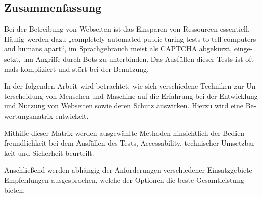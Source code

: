 \begin{otherlanguage}{ngerman}
	\chapter*{Zusammenfassung}
	Bei der Betreibung von Webseiten ist das Einsparen von Ressourcen essentiell. 
	Häufig werden dazu „completely automated public turing tests to tell computers and humans apart“, im Sprachgebrauch meist als CAPTCHA abgekürzt, eingesetzt, um Angriffe durch Bots zu unterbinden. 
	Das Ausfüllen dieser Tests ist oftmals kompliziert und stört bei der Benutzung.

	In der folgenden Arbeit wird betrachtet, wie sich verschiedene Techniken zur Unterscheidung von Menschen und Maschine auf die Erfahrung bei der Entwicklung und Nutzung von Webseiten sowie deren Schutz auswirken. 
	Hierzu wird eine Bewertungsmatrix entwickelt. 

	Mithilfe dieser Matrix werden ausgewählte Methoden hinsichtlich der Bedienfreundlichkeit bei dem Ausfüllen des Tests, Accessability, technischer Umsetzbarkeit und Sicherheit beurteilt. 
	 
	Anschließend werden abhängig der Anforderungen verschiedener Einsatzgebiete Empfehlungen ausgesprochen, welche der Optionen die beste Gesamtleistung bieten.

\end{otherlanguage}

